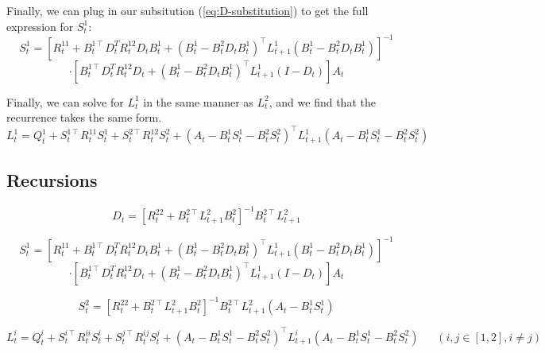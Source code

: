 \documentclass[11pt]{article}
\newcommand{\T}{\intercal}
\begin{document}
Finally, we can plug in our subsitution (\ref{eq:D-substitution}) to get the full expression for $S^1_t$:
\begin{equation}
\label{eq:S1t}
S^1_t = \left[ R^{11}_t 
             + B^{1\T}_t D_t^T R^{12}_t D_t B^1_t
             + \left( B^1_t - B^2_t D_t B^1_t \right)^\T
               L^1_{t+1}
               \left( B^1_t - B^2_t D_t B^1_t \right)
      \right]^{-1}
\end{equation}
\[
      \cdot \left[ B^{1\T}_t D_t^T R^{12}_t D_t
             + \left( B^1_t - B^2_t D_t B^1_t \right)^\T
               L^1_{t+1} \left(I - D_t\right) \right]
      A_t
\]

Finally, we can solve for $L^1_t$ in the same manner as $L^2_t$, and we find that the recurrence takes the same form.
\begin{equation}
L^1_t = Q^1_t + S^{1\T}_t R^{11}_t S^1_t + S^{2\T}_t R^{12}_t S^2_t + \left(A_t - B^1_t S^1_t - B^2_t S^2_t\right)^\T L^1_{t+1} \left(A_t - B^1_t S^1_t - B^2_t S^2_t\right)
\end{equation}

\subsection{Recursions}

\begin{equation}
D_t = \left[ R^{22}_t + B^{2\T}_t L^2_{t+1} B^2_t \right]^{-1} B^{2\T}_t L^2_{t+1}
\end{equation}

\begin{equation}
S^1_t = \left[ R^{11}_t 
             + B^{1\T}_t D_t^T R^{12}_t D_t B^1_t
             + \left( B^1_t - B^2_t D_t B^1_t \right)^\T
               L^1_{t+1}
               \left( B^1_t - B^2_t D_t B^1_t \right)
      \right]^{-1}
\end{equation}
\[
      \cdot \left[ B^{1\T}_t D_t^T R^{12}_t D_t
             + \left( B^1_t - B^2_t D_t B^1_t \right)^\T
               L^1_{t+1} \left(I - D_t\right) \right]
      A_t
\]

\begin{equation}
S^2_t = \left[R^{22}_t + B^{2\T}_t L^2_{t+1} B^2_t\right]^{-1} B^{2\T}_t L^2_{t+1} \left( A_t - B^1_t S^1_t \right)
\end{equation}

\begin{equation}
L^i_t = Q^i_t + S^{i\T}_t R^{ii}_t S^i_t + S^{j\T}_t R^{ij}_t S^j_t + \left(A_t - B^1_t S^1_t - B^2_t S^2_t\right)^\T L^i_{t+1} \left(A_t - B^1_t S^1_t - B^2_t S^2_t\right) ~~~~~~~ (i, j \in [1, 2], i \neq j)
\end{equation}
\end{document}

